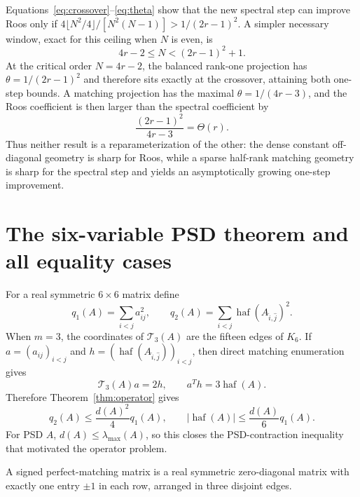 \documentclass[11pt]{article}
\theoremstyle{remark}\newtheorem{remark}[theorem]{Remark}
\DeclareMathOperator{\haf}{haf}\DeclareMathOperator{\tr}{tr}
\begin{document}
Equations~\eqref{eq:crossover}--\eqref{eq:theta} show that the new spectral
step can improve Roos only if
$4\lfloor N^2/4\rfloor/[N^2(N-1)]>1/(2r-1)^2$.
A simpler necessary window, exact for this ceiling when $N$ is even, is
\[
4r-2\le N<(2r-1)^2+1.
\]
At the critical order $N=4r-2$, the balanced rank-one projection has
$\theta=1/(2r-1)^2$ and therefore sits exactly at the crossover, attaining both
one-step bounds.  A matching projection has the maximal
$\theta=1/(4r-3)$, and the Roos coefficient is then larger than the spectral
coefficient by
\begin{equation}\label{eq:factor}
\boxed{\frac{(2r-1)^2}{4r-3}=\Theta(r).}
\end{equation}
Thus neither result is a reparameterization of the other: the dense constant
off-diagonal geometry is sharp for Roos, while a sparse half-rank matching
geometry is sharp for the spectral step and yields an asymptotically growing
one-step improvement.

\section{The six-variable PSD theorem and all equality cases}
For a real symmetric $6\times6$ matrix define
\begin{equation}\label{eq:q}
q_1(A)=\sum_{i<j}a_{ij}^2,\qquad
q_2(A)=\sum_{i<j}\haf(A_{\widehat i,\widehat j})^2.
\end{equation}
When $m=3$, the coordinates of $\mathcal T_3(A)$ are the fifteen edges of
$K_6$.  If $a=(a_{ij})_{i<j}$ and
$h=(\haf(A_{\widehat i,\widehat j}))_{i<j}$, then direct matching enumeration
gives
\begin{equation}\label{eq:gradient}
\mathcal T_3(A)a=2h,\qquad a^Th=3\haf(A).
\end{equation}
Therefore Theorem~\ref{thm:operator} gives
\begin{equation}\label{eq:six}
\boxed{
q_2(A)\le\frac{d(A)^2}{4}q_1(A),\qquad
|\haf(A)|\le\frac{d(A)}6q_1(A).
}
\end{equation}
For PSD $A$, $d(A)\le\lambda_{\max}(A)$, so this closes the PSD-contraction
inequality that motivated the operator problem.

A signed perfect-matching matrix is a real symmetric zero-diagonal matrix
with exactly one entry $\pm1$ in each row, arranged in three disjoint edges.
\end{document}
